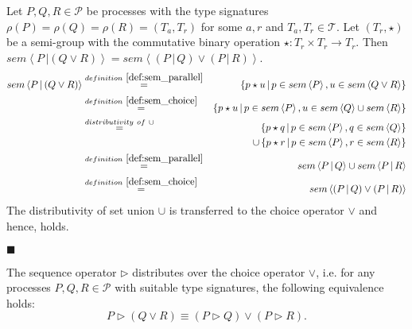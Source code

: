 \begin{myproof}
Let $P, Q, R \in \mathcal{P}$ be processes with the type signatures $\rho \left( P \right) = \rho \left( Q \right) = \rho \left( R \right) = \left( T_a, T_r \right)$ for some $a, r$ and $T_a, T_r \in \mathcal{T}$. Let $\left( T_r, \star \right)$ be a semi-group with the commutative binary operation $\star \colon T_r \times T_r \to T_r$. Then $sem \left\langle P \,| \left( Q \vee R \right) \right\rangle = sem \left\langle \left( P \,|\, Q \right) \vee \left( P \,|\, R \right) \right\rangle$.
\begin{eqnarray*}
  sem \left\langle P \,| \left( Q \vee R \right) \right\rangle & \overset{\defref{def:sem_parallel}}{=} & \left\{ p \star u \,|\, p \in sem \left\langle P \right\rangle, u \in sem \left\langle Q \vee R \right\rangle \right\} \\
  & \overset{\defref{def:sem_choice}}{=} & \left\{ p \star u \,|\, p \in sem \left\langle P \right\rangle, u \in sem \left\langle Q \right\rangle \cup sem \left\langle R \right\rangle \right\} \\
  & \overset{distributivity \ of \ \cup}{=} & \hspace*{0.8em} \left\{ p \star q \,|\, p \in sem \left\langle P \right\rangle, q \in sem \left\langle Q \right\rangle \right\} \\
  & & \cup \left\{ p \star r \,|\, p \in sem \left\langle P \right\rangle, r \in sem \left\langle R \right\rangle \right\} \\
  & \overset{\defref{def:sem_parallel}}{=} & sem \left\langle P \,|\, Q \right\rangle \cup sem \left\langle P \,|\, R \right\rangle \\
  & \overset{\defref{def:sem_choice}}{=} & sem \left\langle \left( P \,|\, Q \right) \vee \left( P \,|\, R \right) \right\rangle
\end{eqnarray*}
The distributivity of set union $\cup$ is transferred to the choice operator $\vee$ and hence,  holds.

\hfill$\blacksquare$
\end{myproof}

\begin{theorem}
\label{thm:distributivity_sequence_choice}
The sequence operator $\triangleright$ distributes over the choice operator $\vee$, i.e. for any processes $P, Q, R \in \mathcal{P}$ with suitable type signatures, the following equivalence holds:
\begin{equation*}
  P \triangleright \left( Q \vee R \right) \equiv \left( P \triangleright Q \right) \vee \left( P \triangleright R \right).
\end{equation*}
\end{theorem}

